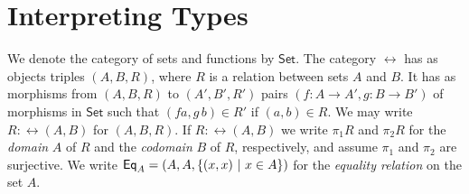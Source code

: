 \documentclass[runningheads]{llncs}
\newcommand{\set}{\mathsf{Set}}
\newcommand{\map}{\mathsf{map}}
\newcommand{\fold}{\mathit{fold}}
\begin{document}
\begin{comment}
$\mathit{flatten}$ function is typeable as follows:
\[\begin{array}{l}
\AXC{$\Gamma;\alpha,\beta \vdash \mathit{List} \, \alpha$}
\AXC{$\Gamma;\beta \vdash \mathit{PTree}\,\beta \hspace*{0.3in}
  \Gamma;\beta \vdash \mathit{List}\,\beta$}
\BIC{$\Gamma;\emptyset~|~\emptyset \vdash
  \map^{F,G}_{\mathit{List}\,\alpha}  : \Nat^\emptyset
  (\Nat^\beta(\mathit{PTree}\, 
  \beta)\,(\mathit{List}\, \beta))\,
 (\Nat^\beta\,(\mathit{List}\,
  (\mathit{PTree}\, \beta))\,(\mathit{List}\, (\mathit{List}\,
  \beta)))$}
\DisplayProof
\end{array}\]
Similar remarks explain the appearance of $\ol \gamma$ in the typing
rules for $\tin$ and $\fold$.

\end{comment}

\vspace*{-0.1in}

\section{Interpreting Types}\label{sec:type-interp}

\vspace*{-0.1in}

We denote the category of sets and functions by $\set$. The category
$\rel$ has as objects triples $(A,B,R)$, where $R$ is a relation
between sets $A$ and $B$.
It has as morphisms from $(A,B,R)$ to $(A',B',R')$ pairs $(f : A \to
A',g : B \to B')$ of morphisms in $\set$ such that $(f a,g\,b) \in R'$
if $(a,b) \in R$. We may write $R : \rel(A,B)$ for $(A,B,R)$.
If $R : \rel(A,B)$ we write $\pi_1 R$ and $\pi_2 R$ for the {\em
  domain} $A$ of $R$ and the {\em codomain} $B$ of $R$, respectively,
and assume $\pi_1$ and $\pi_2$ are surjective. We write $\mathsf{Eq}_A =
(A,A,\{(x,x)~|~ x \in A\})$ for the {\em equality relation} on the set
$A$.
\end{document}
